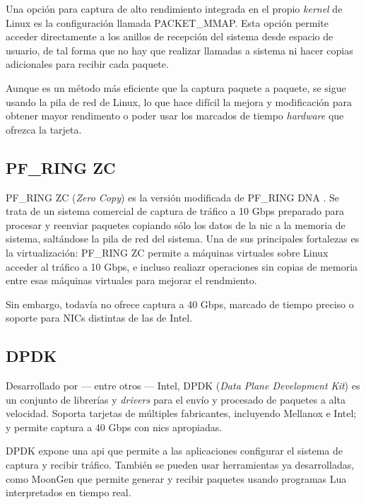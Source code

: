\documentclass[oneside, draft]{epstfg}
\begin{document}
Una opción para captura de alto rendimiento integrada en el propio \textit{kernel} de Linux es la configuración llamada PACKET\_MMAP. Esta opción permite acceder directamente a los anillos de recepción del sistema desde espacio de usuario, de tal forma que no hay que realizar llamadas a sistema ni hacer copias adicionales para recibir cada paquete.

Aunque es un método más eficiente que la captura paquete a paquete, se sigue usando la pila de red de Linux, lo que hace difícil la mejora y modificación para obtener mayor rendimento o poder usar los marcados de tiempo \textit{hardware} que ofrezca la tarjeta.

\subsection{PF\_RING ZC}

PF\_RING ZC (\textit{Zero Copy}) es la versión modificada de PF\_RING DNA \cite{rizzo201210}. Se trata de un sistema comercial de captura de tráfico a 10 Gbps preparado para procesar y reenviar paquetes copiando sólo los datos de la \gls{nic} a la memoria de sistema, saltándose la pila de red del sistema. Una de sus principales fortalezas es la virtualización: PF\_RING ZC permite a máquinas virtuales sobre Linux acceder al tráfico a 10 Gbps, e incluso realiazr operaciones sin copias de memoria entre esas máquinas virtuales para mejorar el rendmiento.

Sin embargo, todavía no ofrece captura a 40 Gbps, marcado de tiempo preciso o soporte para NICs distintas de las de Intel.

\subsection{DPDK}

Desarrollado por --- entre otros --- Intel, DPDK (\textit{Data Plane Development Kit}) \cite{IntelDPDK} es un conjunto de librerías y \textit{drivers} para el envío y procesado de paquetes a alta velocidad. Soporta tarjetas de múltiples fabricantes, incluyendo Mellanox e Intel; y permite captura a 40 Gbps con \glspl{nic} apropiadas.

DPDK expone una \gls{api} que permite a las aplicaciones configurar el sistema de captura y recibir tráfico. También se pueden usar herramientas ya desarrolladas, como MoonGen \cite{emmerich2015moongen} que permite generar y recibir paquetes usando programas Lua interpretados en tiempo real.
\end{document}
